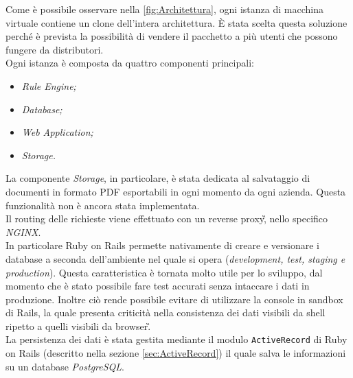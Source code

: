 Come è possibile osservare nella \autoref{fig:Architettura}, ogni istanza di macchina virtuale contiene un clone dell'intera architettura. È stata scelta questa soluzione perché è prevista la possibilità di vendere il pacchetto a più utenti che possono fungere da distributori.\\
Ogni istanza è composta da quattro componenti principali:
\begin{itemize}
	\item \textit{Rule Engine;}
	\item \textit{Database;}
	\item \textit{Web Application;}
	\item \textit{Storage.}
\end{itemize}
La componente \textit{Storage}, in particolare, è stata dedicata al salvataggio di documenti in formato PDF esportabili in ogni momento da ogni azienda. Questa funzionalità non è ancora stata implementata. \\
Il routing delle richieste viene effettuato con un \gls{reverse proxy}\G, nello specifico \textit{NGINX}. \\
In particolare Ruby on Rails permette nativamente di creare e versionare i database a seconda dell'ambiente nel quale si opera (\textit{development, test, staging e production}). Questa caratteristica è tornata molto utile per lo sviluppo, dal momento che è stato possibile fare test accurati senza intaccare i dati in produzione. Inoltre ciò rende possibile evitare di utilizzare la console in sandbox di Rails, la quale presenta criticità nella consistenza dei dati visibili da shell ripetto a quelli visibili da \gls{browser}\G. \\
La persistenza dei dati è stata gestita mediante il modulo \texttt{ActiveRecord} di Ruby on Rails (descritto nella sezione \ref{sec:ActiveRecord}) il quale salva le informazioni su un database \textit{ PostgreSQL}.
